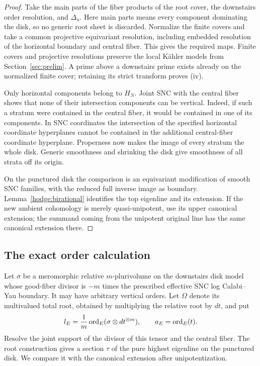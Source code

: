 \begin{proof}
Take the main parts of the fiber products of the root cover, the
downstairs order resolution, and \(\Delta_u\).  Here main parts
means every component dominating the disk, so no generic root
sheet is discarded.  Normalize the finite covers and take a common
projective equivariant resolution, including embedded resolution
of the horizontal boundary and central fiber.  This gives the
required maps.  Finite covers and projective resolutions preserve
the local K\"ahler models from Section~\ref{sec:prelim}.  A prime
above a downstairs prime exists already on the normalized finite
cover; retaining its strict transform proves \textup{(iv)}.

Only horizontal components belong to \(H_N\).  Joint SNC with the
central fiber shows that none of their intersection components can
be vertical.  Indeed, if such a stratum were contained in the
central fiber, it would be contained in one of its components.  In
SNC coordinates the intersection of the specified horizontal
coordinate hyperplanes cannot be contained in the additional
central-fiber coordinate hyperplane.  Properness now makes the
image of every stratum the whole disk.  Generic smoothness and
shrinking the disk give smoothness of all strata off its origin.

On the punctured disk the comparison is an equivariant
modification of smooth SNC families, with the reduced full
inverse image as boundary.  Lemma~\ref{hodge:birational} identifies
the top eigenline and its extension.  If the new ambient
cohomology is merely quasi-unipotent, use its upper canonical
extension; the summand coming from the unipotent original line
has the same canonical extension there.
\end{proof}

\subsection{The exact order calculation}
\label{orders:localcalculation}

Let \(\sigma\) be a meromorphic relative \(m\)-plurivolume on the
downstairs disk model whose good-fiber divisor is \(-m\) times the prescribed
effective SNC log Calabi--Yau boundary.  It may have arbitrary
vertical orders.  Let \(\Omega\) denote its multivalued total root,
obtained by multiplying the relative root by \(dt\), and put
\[
 l_E=\frac1m\operatorname{ord}_E(\sigma\otimes dt^{\otimes m}),
 \qquad a_E=\operatorname{ord}_E(t).
\]
Resolve the joint support of the divisor of this tensor and the
central fiber.  The root construction gives a section \(\tau\)
of the pure highest eigenline on the punctured disk.  We compare
it with the canonical extension after unipotentization.

